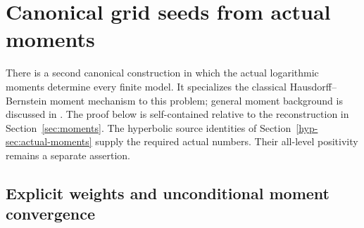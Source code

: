 \documentclass[11pt,a4paper]{article}
\numberwithin{equation}{section}
\theoremstyle{definition}
\theoremstyle{remark}
\begin{document}
\section[Canonical grid seeds]{Canonical grid seeds from actual moments}
\label{sec:canonical-grid}

There is a second canonical construction in which the actual logarithmic
moments determine every finite model. It specializes the classical
Hausdorff--Bernstein moment mechanism to this problem; general moment
background is discussed in \cite{curto-fialkow}. The proof below is
self-contained relative to the reconstruction in
Section~\ref{sec:moments}. The hyperbolic source identities of
Section~\ref{hyp-sec:actual-moments} supply the required actual numbers.
Their all-level positivity remains a separate assertion.

\subsection{Explicit weights and unconditional moment convergence}
\end{document}
